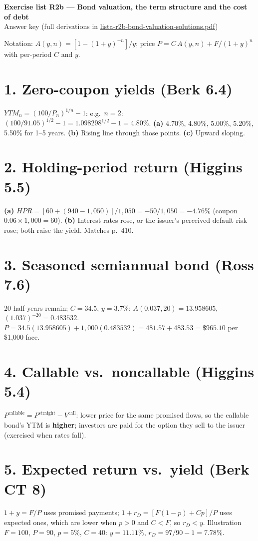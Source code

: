 \documentclass[11pt,a4paper]{article}
\begin{document}
\begin{center}{\Large\bfseries Exercise list R2b --- Bond valuation, the term structure and the cost of debt}\\[4pt]{\large Answer key (full derivations in \url{lista-r2b-bond-valuation-solutions.pdf})}\end{center}

Notation: $A(y,n)=[1-(1+y)^{-n}]/y$; price $P=C\,A(y,n)+F/(1+y)^n$ with per-period $C$ and $y$.

\section*{1. Zero-coupon yields (Berk 6.4)}
$YTM_n=(100/P_n)^{1/n}-1$: e.g.\ $n=2$: $(100/91.05)^{1/2}-1=1.098298^{1/2}-1=4.80\%$.
\textbf{(a)} 4.70\%, 4.80\%, 5.00\%, 5.20\%, 5.50\% for 1--5 years. \textbf{(b)} Rising line through those points.
\textbf{(c)} Upward sloping.

\section*{2. Holding-period return (Higgins 5.5)}
\textbf{(a)} $HPR=[60+(940-1{,}050)]/1{,}050=-50/1{,}050=-4.76\%$ (coupon $0.06\times1{,}000=60$).
\textbf{(b)} Interest rates rose, or the issuer's perceived default risk rose; both raise the yield. Matches p.~410.

\section*{3. Seasoned semiannual bond (Ross 7.6)}
20 half-years remain; $C=34.5$, $y=3.7\%$: $A(0.037,20)=13.958605$, $(1.037)^{-20}=0.483532$.
$P=34.5(13.958605)+1{,}000(0.483532)=481.57+483.53=\$965.10$ per \$1,000 face.

\section*{4. Callable vs.\ noncallable (Higgins 5.4)}
$P^{\text{callable}}=P^{\text{straight}}-V^{\text{call}}$: lower price for the same promised flows, so the callable bond's
YTM is \textbf{higher}; investors are paid for the option they sell to the issuer (exercised when rates fall).

\section*{5. Expected return vs.\ yield (Berk CT 8)}
$1+y=F/P$ uses promised payments; $1+r_D=[F(1-p)+Cp]/P$ uses expected ones, which are lower when $p>0$ and $C<F$, so $r_D<y$.
Illustration $F=100$, $P=90$, $p=5\%$, $C=40$: $y=11.11\%$, $r_D=97/90-1=7.78\%$.
\end{document}
